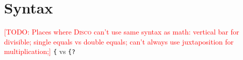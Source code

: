 \documentclass[submission,copyright,creativecommons]{eptcs}
\newcommand{\disco}{\textsc{Disco}\xspace}
\newcommand{\todo}[1]{\textcolor{red}{[TODO: #1]}}
\newcommand{\todo}[1]{}
\begin{document}





\section{Syntax}

\todo{Places where \disco can't use same syntax as math: vertical bar for
divisible; single equals vs double equals; can't always use
juxtaposition for multiplication;} \verb|{| vs \verb|{?|
\end{document}
